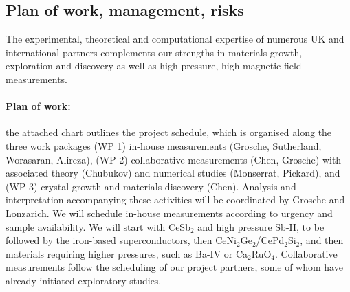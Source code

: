 \subsection*{Plan of work, management,
risks}
\noindent
The experimental, theoretical and computational expertise of numerous UK and international partners complements our strengths in materials growth, exploration and discovery as well as high pressure, high magnetic field measurements. 



\paragraph{Plan of work:} the attached chart outlines the project schedule, which is organised along the three work packages (WP 1) in-house measurements (Grosche, Sutherland, Worasaran, Alireza), (WP 2) collaborative measurements  (Chen, Grosche) with associated theory (Chubukov) and numerical studies (Monserrat, Pickard), and (WP 3) crystal growth and materials discovery (Chen). Analysis and interpretation accompanying these activities will be coordinated by Grosche and Lonzarich.  We will schedule in-house measurements according to urgency and sample availability. We will start with CeSb$_2$ and  high pressure Sb-II, to be followed by the iron-based superconductors, then CeNi$_2$Ge$_2$/CePd$_2$Si$_2$, and then materials requiring higher pressures, such as Ba-IV or Ca$_2$RuO$_4$. Collaborative measurements follow the scheduling of our project partners, some of whom have already initiated exploratory studies.

